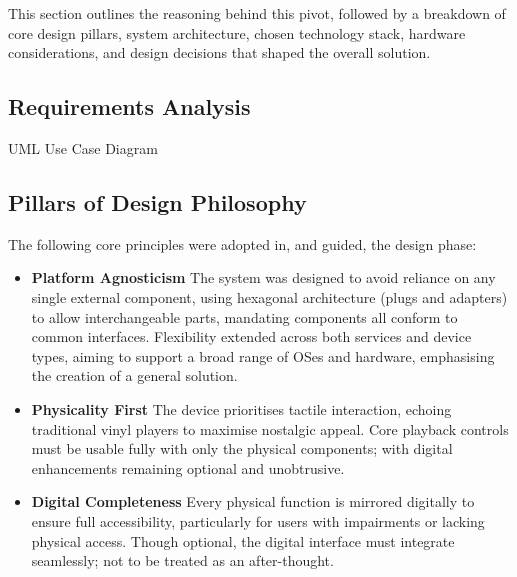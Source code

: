         This section outlines the reasoning behind this pivot, followed by a breakdown of core design pillars, system architecture, chosen technology stack, hardware considerations, and design decisions that shaped the overall solution.
        
        \subsection{Requirements Analysis}
    
            \begin{temp}
                UML Use Case Diagram
            \end{temp}
    
        \subsection{Pillars of Design Philosophy}
    
            The following core principles were adopted in, and guided, the design phase:
    
            \begin{itemize}
                \item \textbf{Platform Agnosticism} The system was designed to avoid reliance on any single external component, using hexagonal architecture (plugs and adapters) to allow interchangeable parts, mandating components all conform to common interfaces. Flexibility extended across both services and device types, aiming to support a broad range of OSes and hardware, emphasising the creation of a general solution.
            \end{itemize}
    
            \begin{itemize}
                \item \textbf{Physicality First} The device prioritises tactile interaction, echoing traditional vinyl players to maximise nostalgic appeal. Core playback controls must be usable fully with only the physical components; with digital enhancements remaining optional and unobtrusive.
            \end{itemize}
    
            \begin{itemize}
                \item \textbf{Digital Completeness} Every physical function is mirrored digitally to ensure full accessibility, particularly for users with impairments or lacking physical access. Though optional, the digital interface must integrate seamlessly; not to be treated as an after-thought.
            \end{itemize}
    
